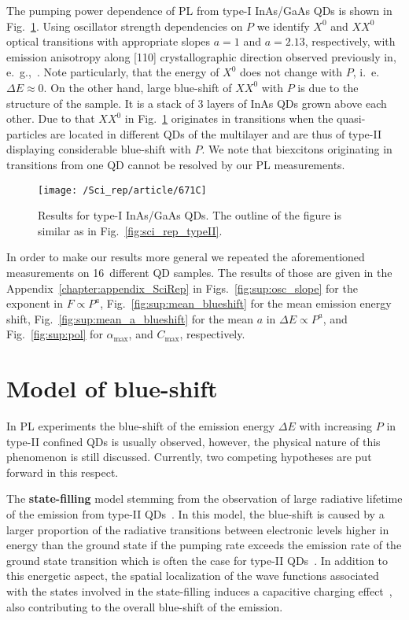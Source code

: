 The pumping power dependence of PL from type-I InAs/GaAs QDs is shown in Fig.~\ref{fig:671C}. Using oscillator strength dependencies on $P$ we identify  $X^0$ and $XX^0$ optical transitions with appropriate slopes $a=1$ and $a=2.13$, respectively, with emission anisotropy along [110] crystallographic direction observed previously in, e.~g.,~\citep{HumPhysE}. Note particularly, that the energy of $X^0$ does not change with $P$, i.~e. $\Delta E\approx 0$. On the other hand, large blue-shift of $XX^0$ with $P$ is due to the structure of the sample. It is a stack of 3 layers of InAs QDs grown above each other. Due to that $XX^0$ in Fig.~\ref{fig:671C} originates in transitions when the quasi-particles are located in different QDs of the multilayer and are thus of type-II displaying considerable blue-shift with $P$. We note that biexcitons originating in transitions from one QD cannot be resolved by our PL measurements.
%
\begin{figure}
	\centering
	\texttt{[image: /Sci\_rep/article/671C]}
	\caption{Results for type-I InAs/GaAs QDs. The outline of the figure is similar as in Fig.~\ref{fig:sci_rep_typeII}.}
	\label{fig:671C}
\end{figure}

In order to make our results more general we repeated the aforementioned measurements on 16~different QD samples. The results of those are given in the Appendix~\ref{chapter:appendix_SciRep} in Figs.~\ref{fig:sup:osc_slope} for the exponent in $F\propto P^a$, Fig.~\ref{fig:sup:mean_blueshift} for the mean emission energy shift, Fig.~\ref{fig:sup:mean_a_blueshift} for the mean $a$ in $\Delta E \propto P^a$, and Fig.~\ref{fig:sup:pol} for $\alpha_{\mathrm{max}}$, and $C_{\mathrm{max}}$, respectively.
\newpage 





\section{Model of blue-shift}\label{sec:scirep_pumpingmodel}
In PL experiments the blue-shift of the emission energy $\Delta E$ with increasing $P$ in type-II confined QDs is usually observed, however, the physical nature of this phenomenon is still discussed. Currently, two competing hypotheses are put forward in this respect.

The \textbf{state-filling} model stemming from the observation of large radiative lifetime of the emission from type-II QDs~\citep{Liao2009,Nishikawa2012,Sato2012,Pavarelli2012,Young2014}. In this model, the blue-shift is caused by a larger proportion of the radiative transitions between electronic levels higher in energy than the ground state if the pumping rate exceeds the emission rate of the ground state transition which is often the case for type-II QDs~\citep{Gradkowski2012}. In addition to this energetic aspect, the spatial localization of the wave functions associated with the states involved in the state-filling induces a capacitive charging effect~\citep{Muller-Kirsch2001}, also contributing to the overall blue-shift of the emission.


